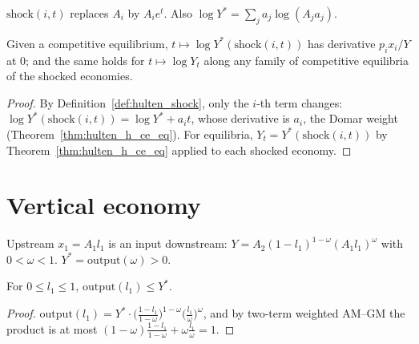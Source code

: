 \begin{definition}
\label{def:hulten_shock}
\leanok
{}
$\mathrm{shock}(i, t)$ replaces $A_i$ by $A_i e^t$. Also $\log Y^* = \sum_j a_j \log(A_j a_j)$.
\end{definition}

\begin{theorem}
\label{thm:hulten_horizontal}
\leanok
{}
Given a competitive equilibrium, $t \mapsto \log Y^*(\mathrm{shock}(i, t))$ has derivative $p_i x_i / Y$ at $0$; and
the same holds for $t \mapsto \log Y_t$ along any family of competitive equilibria of the shocked economies.
\end{theorem}
\begin{proof}
\leanok
By Definition~\ref{def:hulten_shock}, only the $i$-th term changes:
$\log Y^*(\mathrm{shock}(i, t)) = \log Y^* + a_i t$, whose derivative is $a_i$, the Domar weight
(Theorem~\ref{thm:hulten_h_ce_eq}). For equilibria, $Y_t = Y^*(\mathrm{shock}(i, t))$ by Theorem~\ref{thm:hulten_h_ce_eq}
applied to each shocked economy.
\end{proof}

\section{Vertical economy}
\label{sec:hulten_vertical}

\begin{definition}
\label{def:hulten_vertical}
\leanok
Upstream $x_1 = A_1 l_1$ is an input downstream: $Y = A_2 (1 - l_1)^{1-\omega}(A_1 l_1)^\omega$ with $0 < \omega < 1$.
$Y^* = \mathrm{output}(\omega) > 0$.
\end{definition}

\begin{theorem}
\label{thm:hulten_v_output_le}
\leanok
{}
For $0 \le l_1 \le 1$, $\mathrm{output}(l_1) \le Y^*$.
\end{theorem}
\begin{proof}
\leanok
$\mathrm{output}(l_1) = Y^* \cdot \big(\tfrac{1 - l_1}{1-\omega}\big)^{1-\omega}\big(\tfrac{l_1}{\omega}\big)^\omega$, and by
two-term weighted AM--GM the product is at most $(1-\omega)\tfrac{1-l_1}{1-\omega} + \omega\tfrac{l_1}{\omega} = 1$.
\end{proof}

